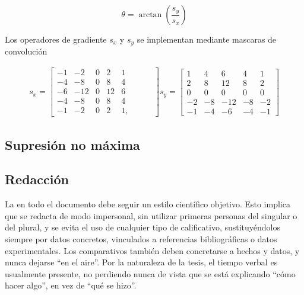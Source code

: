\begin{equation}
\theta = \arctan\left({\frac{s_{y}}{s_{x}}}\right)
\end{equation} 

Los operadores de gradiente $s_{x}$ y $s_{y}$ se implementan mediante mascaras de convolución 

\begin{equation}
\begin{array}{cclcccl}
s_{x} =\begin{bmatrix}
-1 & -2 & 0 & 2 & 1 \\ 
-4 & -8 & 0 & 8 & 4 \\ 
-6 & -12 & 0 & 12 & 6 \\ 
-4 & -8 & 0 & 8 & 4 \\ 
-1 & -2 & 0 & 2 & 1, &\hspace{1em}&
\end{bmatrix}
s_{y} =\begin{bmatrix}
1 & 4 & 6 & 4 & 1 \\ 
2 & 8 & 12 & 8 & 2 \\ 
0 & 0 & 0 & 0 & 0 \\ 
-2 & -8 & -12 & -8 & -2\\ 
-1 & -4 & -6 & -4 & -1
\end{bmatrix} 
\end{array}
\end{equation}

\subsection{Supresión no máxima}





\subsection{Redacción}

La  en todo el documento debe seguir un estilo científico
objetivo. Esto implica que se redacta de modo impersonal, sin utilizar primeras
personas del singular o del plural, y se evita el uso de cualquier tipo de
calificativo, sustituyéndolos siempre por datos concretos, vinculados a
referencias bibliográficas o datos experimentales. Los comparativos también
deben concretarse a hechos y datos, y nunca dejarse ``en el aire''. Por la
naturaleza de la tesis, el tiempo verbal es usualmente presente, no perdiendo
nunca de vista que se está explicando ``cómo hacer algo'', en vez de ``qué se
hizo''.

